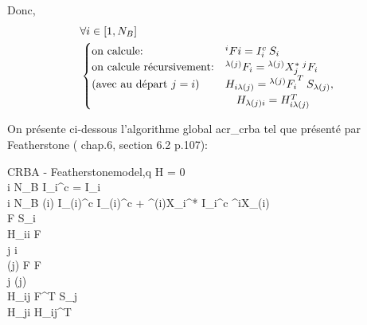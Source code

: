 \documentclass{report}
\begin{document}
\vspace{0.5cm}

\setlength{\columnseprule}{0.5pt}
\begin{multicols}{2}\raggedcolumns
\begin{flushleft}
Donc, 
\begin{align*}
&\forall i \in [1,N_B] \\
&\begin{cases}
  \textnormal{on calcule:} & ^iFi = {I_i^c} \: S_i \\
  \textnormal{on calcule récursivement:} & {^{\lambda(j)}F_i}  =  {^{\lambda(j)}X_j^*} \: {^jF_i} \\
  \textnormal{(avec au départ $j=i$)} & H_{i{\lambda(j)}} = {^{\lambda(j)}F_i}^T \: S_{\lambda(j)} , \\
                                                          & \quad H_{{\lambda(j)}i} = H_{i{\lambda(j)}}^T
\end{cases}
\end{align*}

\vspace{0.5cm}

On présente ci-dessous l'algorithme global \gls{acr_crba} tel que présenté par Featherstone (\cite{bib_featherstone} chap.6, section 6.2 p.107):
\end{flushleft}

    	\begin{spacing}{1.5}
		\begin{pseudocode}{CRBA - Featherstone}{model,q} \label{algo_crbaFeatherstone}
    H = 0 \\
		\FOR i  \TO N_B \DO
		  I_i^c = I_i \\
		\FOR i \GETS N_B  \DO
		\BEGIN
		  \IF \lambda(i) 
		  \THEN
		    I_{\lambda(i)}^c \GETS I_{\lambda(i)}^c + {^{\lambda(i)}X_i^*} \: {I_i^c} \: {^iX_{\lambda(i)}} \\
		  F  \: S_i \\
		  H_{ii}  F \\
		  j \GETS i \\
		  \WHILE \lambda(j)  \DO
		  \BEGIN
		    F  F \\
		    j \GETS \lambda(j) \\
		    H_{ij} \GETS F^T S_j \\
		    H_{ji} \GETS H_{ij}^T
		  \END
		\END
	  \end{pseudocode}
	  \end{spacing}

\end{multicols}
\end{document}

